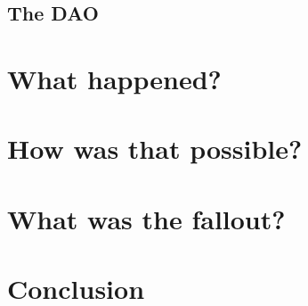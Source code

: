 \documentclass[a4paper, 11pt]{scrartcl}
\begin{document}
\subsection{The DAO}



\section{What happened?}

\section{How was that possible?}

\section{What was the fallout?}

\section{Conclusion}

\nocite{*}
\clearpage
\printbibliography[heading=bibintoc]
\end{document}
